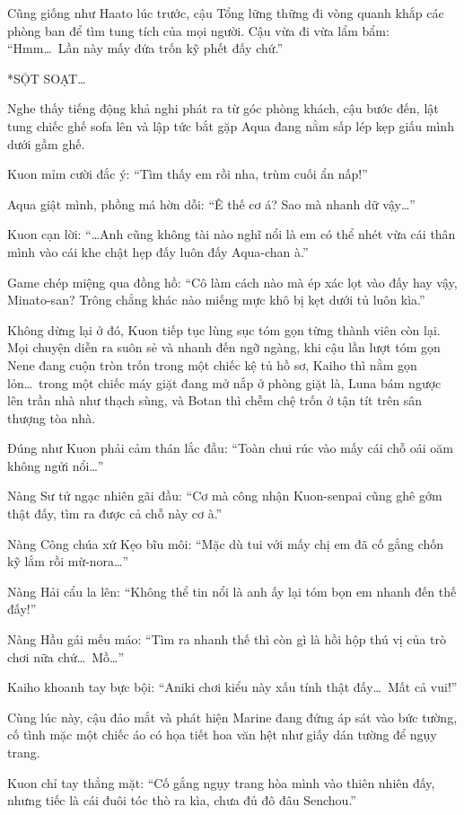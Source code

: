 \documentclass[../main.tex]{subfiles}
\begin{document}
Cũng giống như Haato lúc trước, cậu Tổng lững thững đi vòng quanh khắp các phòng ban để tìm tung tích của mọi người. Cậu vừa đi vừa lẩm bẩm: ``Hmm\dots\ Lần này mấy đứa trốn kỹ phết đấy chứ.''

*SỘT SOẠT\dots*

Nghe thấy tiếng động khả nghi phát ra từ góc phòng khách, cậu bước đến, lật tung chiếc ghế sofa lên và lập tức bắt gặp Aqua đang nằm sấp lép kẹp giấu mình dưới gầm ghế.

Kuon mỉm cười đắc ý: ``Tìm thấy em rồi nha, trùm cuối ẩn nấp!''

Aqua giật mình, phồng má hờn dỗi: ``Ê thế cơ á? Sao mà nhanh dữ vậy\dots''

Kuon cạn lời: ``\dots Anh cũng không tài nào nghĩ nổi là em có thể nhét vừa cái thân mình vào cái khe chật hẹp đấy luôn đấy Aqua-chan à.''

Game chép miệng qua đồng hồ: ``Cô làm cách nào mà ép xác lọt vào đấy hay vậy, Minato-san? Trông chẳng khác nào miếng mực khô bị kẹt dưới tủ luôn kìa.''

Không dừng lại ở đó, Kuon tiếp tục lùng sục tóm gọn từng thành viên còn lại. Mọi chuyện diễn ra suôn sẻ và nhanh đến ngỡ ngàng, khi cậu lần lượt tóm gọn Nene đang cuộn tròn trốn trong một chiếc kệ tủ hồ sơ, Kaiho thì nằm gọn lỏn\dots\ trong một chiếc máy giặt đang mở nắp ở phòng giặt là, Luna bám ngược lên trần nhà như thạch sùng, và Botan thì chễm chệ trốn ở tận tít trên sân thượng tòa nhà.

Đúng như Kuon phải cảm thán lắc đầu: ``Toàn chui rúc vào mấy cái chỗ oái oăm không ngửi nổi\dots''

Nàng Sư tử ngạc nhiên gãi đầu: ``Cơ mà công nhận Kuon-senpai cũng ghê gớm thật đấy, tìm ra được cả chỗ này cơ à.''

Nàng Công chúa xứ Kẹo bĩu môi: ``Mặc dù tui với mấy chị em đã cố gắng chốn kỹ lắm rồi mừ-nora\dots''

Nàng Hải cẩu la lên: ``Không thể tin nổi là anh ấy lại tóm bọn em nhanh đến thế đấy!''

Nàng Hầu gái mếu máo: ``Tìm ra nhanh thế thì còn gì là hồi hộp thú vị của trò chơi nữa chứ\dots\ Mồ\dots''

Kaiho khoanh tay bực bội: ``Aniki chơi kiểu này xấu tính thật đấy\dots\ Mất cả vui!''

Cùng lúc này, cậu đảo mắt và phát hiện Marine đang đứng áp sát vào bức tường, cố tình mặc một chiếc áo có họa tiết hoa văn hệt như giấy dán tường để ngụy trang.

Kuon chỉ tay thẳng mặt: ``Cố gắng ngụy trang hòa mình vào thiên nhiên đấy, nhưng tiếc là cái đuôi tóc thò ra kìa, chưa đủ đô đâu Senchou.''
\end{document}
